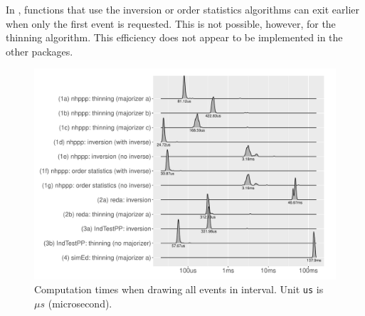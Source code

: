 \documentclass[article,nojss]{jss}\usepackage[]{graphicx}\usepackage[]{xcolor}
\makeatletter
\def\maxwidth{ %
  \ifdim\Gin@nat@width>\linewidth
    \linewidth
  \else
    \Gin@nat@width
  \fi
}
\newenvironment{knitrout}{}{} %
\makeatother
\begin{document}
In , functions that use the inversion or order statistics algorithms can exit earlier when only the first event is requested. This is not possible, however, for the thinning algorithm. This efficiency does not appear to be implemented in the other packages.






\begin{knitrout}
\color{fgcolor}\begin{figure}
\includegraphics[width=\maxwidth]{figure/comptimes_all_samples-1} \caption[Computation times when drawing all events in interval]{Computation times when drawing all events in interval. Unit \texttt{us} is $\mu s$ (microsecond).}\label{fig:comptimes_all_samples}
\end{figure}

\end{knitrout}
\end{document}
